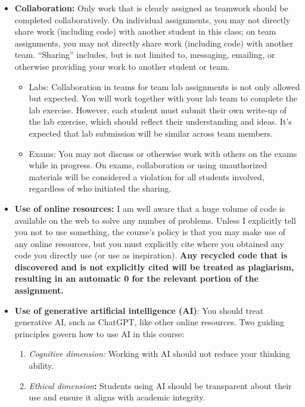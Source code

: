 \documentclass[
  letterpaper,
  DIV=11,
  numbers=noendperiod]{scrartcl}
\begin{document}
\begin{itemize}
\item
  \textbf{Collaboration:} Only work that is clearly assigned as teamwork
  should be completed collaboratively. On individual assignments, you
  may not directly share work (including code) with another student in
  this class; on team assignments, you may not directly share work
  (including code) with another team. ``Sharing'' includes, but is not
  limited to, messaging, emailing, or otherwise providing your work to
  another student or team.

  \begin{itemize}
  \item
    Labs: Collaboration in teams for team lab assignments is not only
    allowed but expected. You will work together with your lab team to
    complete the lab exercise. However, each student must submit their
    own write-up of the lab exercise, which should reflect their
    understanding and ideas. It's expected that lab submission will be
    similar across team members.
  \item
    Exams: You may not discuss or otherwise work with others on the
    exams while in progress. On exams, collaboration or using
    unauthorized materials will be considered a violation for all
    students involved, regardless of who initiated the sharing.
  \end{itemize}
\item
  \textbf{Use of online resources:} I am well aware that a huge volume
  of code is available on the web to solve any number of problems.
  Unless I explicitly tell you not to use something, the course's policy
  is that you may make use of any online resources, but you must
  explicitly cite where you obtained any code you directly use (or use
  as inspiration). \textbf{Any recycled code that is discovered and is
  not explicitly cited will be treated as plagiarism, resulting in an
  automatic 0 for the relevant portion of the assignment.}
\item
  \textbf{Use of generative artificial intelligence (AI)}: You should
  treat generative AI, such as ChatGPT, like other online resources. Two
  guiding principles govern how to use AI in this course:

  \begin{enumerate}
  \def\labelenumi{\arabic{enumi}.}
  \item
    \emph{Cognitive dimension:} Working with AI should not reduce your
    thinking ability.
  \item
    \emph{Ethical dimension}\textbf{:} Students using AI should be
    transparent about their use and ensure it aligns with academic
    integrity.
  \end{enumerate}


\end{itemize}
\end{document}
